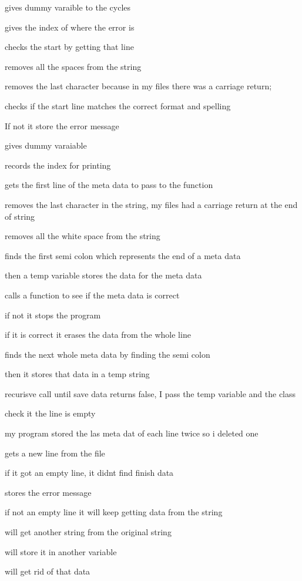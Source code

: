 gives dummy varaible to the cycles

gives the index of where the error is

checks the start by getting that line

removes all the spaces from the string

removes the last character because in my files there was a carriage return;

checks if the start line matches the correct format and spelling

If not it store the error message

gives dummy varaiable

records the index for printing

gets the first line of the meta data to pass to the function

removes the last character in the string, my files had a carriage return at the end of string

removes all the white space from the string

finds the first semi colon which represents the end of a meta data

then a temp variable stores the data for the meta data

calls a function to see if the meta data is correct

if not it stops the program

if it is correct it erases the data from the whole line

finds the next whole meta data by finding the semi colon

then it stores that data in a temp string

recurisve call until save data returns false, I pass the temp variable and the class

check it the line is empty

my program stored the las meta dat of each line twice so i deleted one

gets a new line from the file

if it got an empty line, it didn\textquotesingle{}t find finish data

stores the error message

if not an empty line it will keep getting data from the string

will get another string from the original string

will store it in another variable

will get rid of that data

